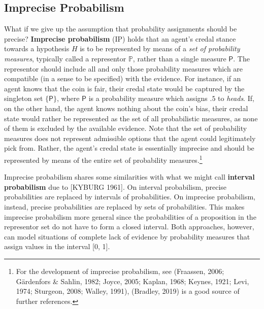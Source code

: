 \documentclass[
  10pt,
  dvipsnames,enabledeprecatedfontcommands]{scrartcl}
\begin{document}
\hypertarget{imprecise-probabilism}{%
\subsection{Imprecise Probabilism}\label{imprecise-probabilism}}

What if we give up the assumption that probability assignments should be
precise? \textbf{Imprecise probabilism} (\textsf{IP}) holds that an
agent's credal stance towards a hypothesis \(H\) is to be represented by
means of a \emph{set of probability measures}, typically called a
representor \(\mathbb{P}\), rather than a single measure \(\mathsf{P}\).
The representor should include all and only those probability measures
which are compatible (in a sense to be specified) with the evidence. For
instance, if an agent knows that the coin is fair, their credal state
would be captured by the singleton set \(\{\mathsf{P}\}\), where
\(\mathsf{P}\) is a probability measure which assigns \(.5\) to
\emph{heads}. If, on the other hand, the agent knows nothing about the
coin's bias, their credal state would rather be represented as the set
of all probabilistic measures, as none of them is excluded by the
available evidence. Note that the set of probability measures does not
represent admissible options that the agent could legitimately pick
from. Rather, the agent's credal state is essentially imprecise and
should be represented by means of the entire set of probability
measures.\footnote{For the development of imprecise probabilism, see
  (Fraassen, 2006; Gärdenfors \& Sahlin, 1982; Joyce, 2005; Kaplan,
  1968; Keynes, 1921; Levi, 1974; Sturgeon, 2008; Walley, 1991),
  (Bradley, 2019) is a good source of further references.}

Imprecise probabilism shares some similarities with what we might call
\textbf{interval probabilism} due to {[}KYBURG
1961{]}.
On interval probabilism, precise probabilities are replaced by intervals
of probabilities. On imprecise probabilism, instead, precise
probabilities are replaced by sets of probabilities. This makes
imprecise probabilism more general since the probabilities of a
proposition in the representor set do not have to form a closed
interval. Both approaches, however, can model situations of complete
lack of evidence by probability measures that assign values in the
interval {[}0, 1{]}.
\end{document}
